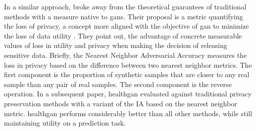             In a similar approach, \citeauthor{Yale_2020} broke away from the theoretical guarantees of traditional methods with a measure native to \glspl{gan}. Their proposal is a metric quantifying the loss of privacy, a concept more aligned with the objective of \gls{gan} to minimize the loss of data utility \cite{yale:hal-02160496,p2019}. They point out, the advantage of concrete measurable values of loss in utility and privacy when making the decision of releasing sensitive data. Briefly, the Nearest Neighbor Adversarial Accuracy measures the loss in privacy based on the difference between two nearest neighbor metrics. The  first component is the proportion of synthetic samples that are closer to any real sample than any pair of real samples. The second component is the reverse operation. In a subsequent paper, \gls{healthgan} evaluated against traditional privacy preservation methods with a variant of the IA based on the nearest neighbor metric. \gls{healthgan} performs considerably better than all other methods, while still maintaining utility on a prediction task.


       



